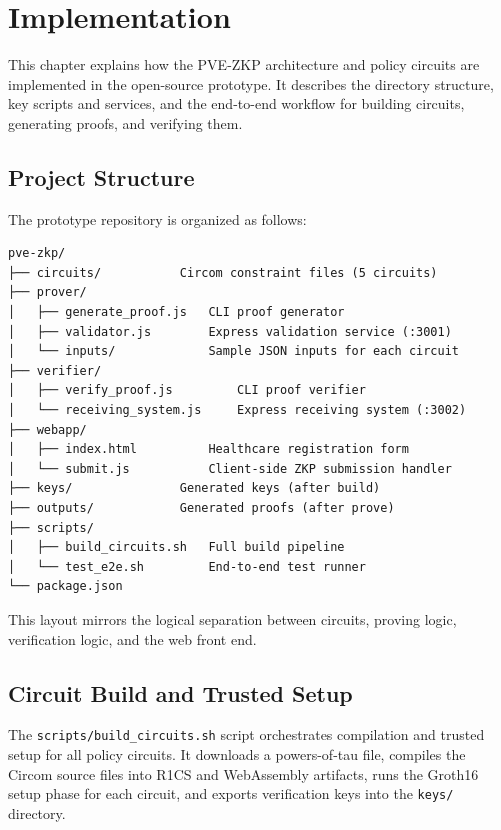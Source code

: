 
\chapter{Implementation}

This chapter explains how the PVE-ZKP architecture and policy circuits are
implemented in the open-source prototype. It describes the directory structure,
key scripts and services, and the end-to-end workflow for building circuits,
generating proofs, and verifying them.

\section{Project Structure}

The prototype repository is organized as follows:

\begin{verbatim}
pve-zkp/
├── circuits/           Circom constraint files (5 circuits)
├── prover/
│   ├── generate_proof.js   CLI proof generator
│   ├── validator.js        Express validation service (:3001)
│   └── inputs/             Sample JSON inputs for each circuit
├── verifier/
│   ├── verify_proof.js         CLI proof verifier
│   └── receiving_system.js     Express receiving system (:3002)
├── webapp/
│   ├── index.html          Healthcare registration form
│   └── submit.js           Client-side ZKP submission handler
├── keys/               Generated keys (after build)
├── outputs/            Generated proofs (after prove)
├── scripts/
│   ├── build_circuits.sh   Full build pipeline
│   └── test_e2e.sh         End-to-end test runner
└── package.json
\end{verbatim}

This layout mirrors the logical separation between circuits, proving logic,
verification logic, and the web front end.

\section{Circuit Build and Trusted Setup}

The \texttt{scripts/build\_circuits.sh} script orchestrates compilation and
trusted setup for all policy circuits. It downloads a powers-of-tau file,
compiles the Circom source files into R1CS and WebAssembly artifacts, runs the
Groth16 setup phase for each circuit, and exports verification keys into the
\texttt{keys/} directory.

